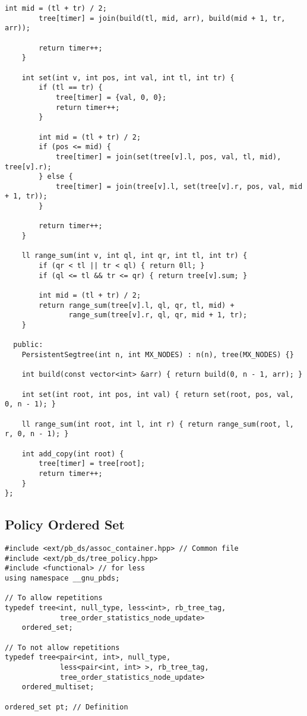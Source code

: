 \documentclass[10pt]{article}
\begin{document}
\begin{multicols*}{2}
\begin{lstlisting}[style=compactcpp]
		int mid = (tl + tr) / 2;
		tree[timer] = join(build(tl, mid, arr), build(mid + 1, tr, arr));

		return timer++;
	}

	int set(int v, int pos, int val, int tl, int tr) {
		if (tl == tr) {
			tree[timer] = {val, 0, 0};
			return timer++;
		}

		int mid = (tl + tr) / 2;
		if (pos <= mid) {
			tree[timer] = join(set(tree[v].l, pos, val, tl, mid), tree[v].r);
		} else {
			tree[timer] = join(tree[v].l, set(tree[v].r, pos, val, mid + 1, tr));
		}

		return timer++;
	}

	ll range_sum(int v, int ql, int qr, int tl, int tr) {
		if (qr < tl || tr < ql) { return 0ll; }
		if (ql <= tl && tr <= qr) { return tree[v].sum; }

		int mid = (tl + tr) / 2;
		return range_sum(tree[v].l, ql, qr, tl, mid) +
		       range_sum(tree[v].r, ql, qr, mid + 1, tr);
	}

  public:
	PersistentSegtree(int n, int MX_NODES) : n(n), tree(MX_NODES) {}

	int build(const vector<int> &arr) { return build(0, n - 1, arr); }

	int set(int root, int pos, int val) { return set(root, pos, val, 0, n - 1); }

	ll range_sum(int root, int l, int r) { return range_sum(root, l, r, 0, n - 1); }

	int add_copy(int root) {
		tree[timer] = tree[root];
		return timer++;
	}
};
\end{lstlisting}

\subsection{Policy Ordered Set}

\begin{lstlisting}[style=compactcpp]
#include <ext/pb_ds/assoc_container.hpp> // Common file
#include <ext/pb_ds/tree_policy.hpp>
#include <functional> // for less
using namespace __gnu_pbds;

// To allow repetitions
typedef tree<int, null_type, less<int>, rb_tree_tag,
             tree_order_statistics_node_update>
    ordered_set;

// To not allow repetitions
typedef tree<pair<int, int>, null_type,
             less<pair<int, int> >, rb_tree_tag,
             tree_order_statistics_node_update>
    ordered_multiset;

ordered_set pt; // Definition


\end{lstlisting}
\end{multicols*}
\end{document}
